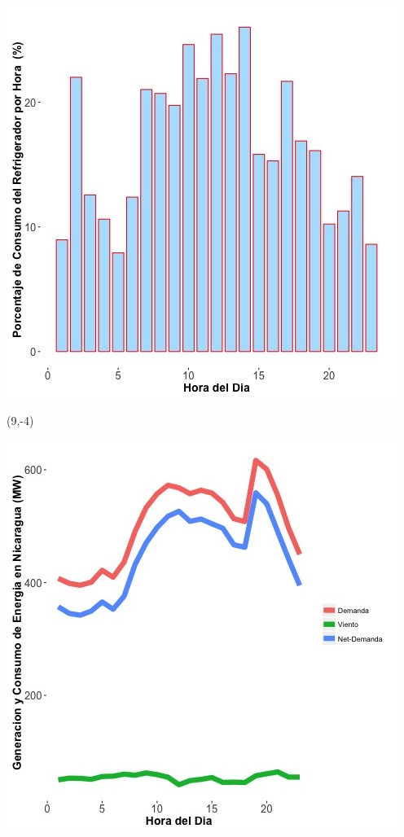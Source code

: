 \documentclass{article}\usepackage[]{graphicx}\usepackage[]{color}
\newenvironment{knitrout}{}{} %
\begin{document}
\begin{knitrout}
\color{fgcolor}
\includegraphics[scale=0.65]{figure/A1_fridge_energy_pct.jpg} 
\end{knitrout}

 \begin{textblock}{1}(9,-4)
\begin{minipage}{20em}
\begingroup

\endgroup
\end{minipage}
\end{textblock}



 \vspace{20cm}


\begin{knitrout}
\color{fgcolor}
\includegraphics[scale=0.65]{figure/gridplot1.jpg} 
\end{knitrout}
\end{document}
